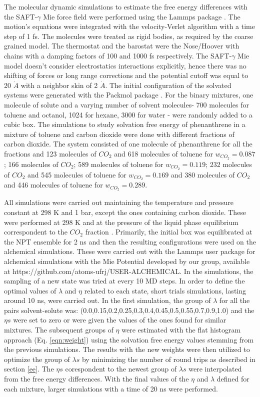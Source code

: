 The molecular dynamic simulations to estimate the free energy differences with the SAFT-$\gamma$ Mie force field were performed using the Lammps package \cite{lammps}. The motion's equations were integrated with the velocity-Verlet algorithm \cite{verlet} with a time step of 1 fs. The molecules were treated as rigid bodies, as required by the coarse grained model. The thermostat and the barostat were the Nose/Hoover with chains with a damping factors of 100 and 1000 fs respectively. The SAFT-$\gamma$ Mie model doesn't consider electrostatics interactions explicitly, hence there was no shifting of forces or long range corrections and the potential cutoff was equal to 20 $\dot{A}$ \cite{muller2017} with a neighbor skin of 2 $\dot{A}$. The initial configuration of the  solvated systems were generated with the Packmol package \cite{packmol}. For the binary mixtures, one molecule of solute and a varying number of solvent molecules- 700 molecules for toluene and octanol, 1024 for hexane, 3000 for water - were randomly added to a cubic box. The simulations to study solvation free energy of phenanthrene in a mixture of toluene and carbon dioxide were done with different fractions of carbon dioxide. The  system consisted of one molecule of phenanthrene for all the fractions and 123 molecules of $CO_{2}$ and 618 molecules of toluene for $w_{CO_{2}} = 0.087$; 166 molecules of $CO_{2}$; 589 molecules of toluene for $w_{CO_{2}} = 0.119$; 232 molecules of $CO_{2}$ and 545 molecules of toluene for $w_{CO_{2}} = 0.169$ and 380 molecules of $CO_{2}$ and 446 molecules of toluene for $w_{CO_{2}} = 0.289$.

All simulations were carried out maintaining the temperature and pressure constant at 298 K and 1 bar, except the ones containing carbon dioxide. These were performed at 298 K and at the pressure of the liquid phase equilibrium correspondent to the $CO_{2}$ fraction \cite{co2toliq}. Primarily, the initial box was equilibrated at the NPT ensemble for 2 ns and then the resulting configurations were used on the alchemical simulations. These were carried out with the Lammps user package for alchemical simulations with the Mie Potential developed by our group, available at https://github.com/atoms-ufrj/USER-ALCHEMICAL. In the simulations, the sampling of a new state was tried at every 10 MD steps. In order to define the optimal values of $\lambda$ and $\eta$ related to each state, short trials simulations, lasting around 10 ns, were carried out. In the first simulation, the group of $\lambda$ for all the pairs solvent-solute was: (0.0,0.15,0.2,0.25,0.3,0.4,0.45,0.5,0.55,0.7,0.9,1.0) and the $\eta s$ were set to zero or were given the values of the ones found for similar mixtures. The subsequent groups of $\eta$ were estimated  with the flat histogram approach (Eq. \eqref{eqn:weight}) using the solvation free energy values stemming from the previous simulations. The results with the new weights were then utilized to optimize the group of $\lambda s$ by minimizing the number of round trips as described in section \ref{ee}. The $\eta s$ corespondent to the newest group of $\lambda s$ were interpolated from the free energy differences. With the final values of the $\eta$ and $\lambda $ defined for each mixture, larger simulations with a time of 20 ns were performed. 

